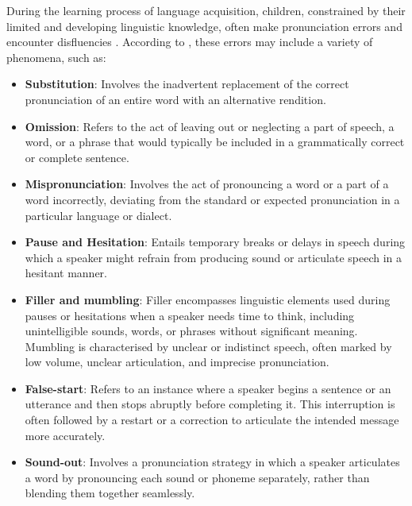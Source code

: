 During the learning process of language acquisition, children, constrained by their limited and developing linguistic knowledge, often make pronunciation errors and encounter disfluencies \cite{language_children}. According to \cite{clark1977psychology}, these errors may include a variety of phenomena, such as:
\begin{itemize}
    \item \textbf{Substitution}:  Involves the inadvertent replacement of the correct pronunciation of an entire word with an alternative rendition.
    \item \textbf{Omission}:  Refers to the act of leaving out or neglecting a part of speech, a word, or a phrase that would typically be included in a grammatically correct or complete sentence.
    \item \textbf{Mispronunciation}:  Involves the act of pronouncing a word or a part of a word incorrectly, deviating from the standard or expected pronunciation in a particular language or dialect.
    \item \textbf{Pause and Hesitation}: Entails temporary breaks or delays in speech during which a speaker might refrain from producing sound or articulate speech in a hesitant manner.
    \item \textbf{Filler and mumbling}:  Filler encompasses linguistic elements used during pauses or hesitations when a speaker needs time to think, including unintelligible sounds, words, or phrases without significant meaning. Mumbling is characterised by unclear or indistinct speech, often marked by low volume, unclear articulation, and imprecise pronunciation.
    \item \textbf{False-start}:  Refers to an instance where a speaker begins a sentence or an utterance and then stops abruptly before completing it. This interruption is often followed by a restart or a correction to articulate the intended message more accurately.
    \item \textbf{Sound-out}: Involves a pronunciation strategy in which a speaker articulates a word by pronouncing each sound or phoneme separately, rather than blending them together seamlessly.
\end{itemize}

